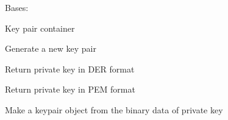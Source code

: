 \documentclass[letterpaper,10pt,english]{sphinxmanual}
\begin{document}

\begin{fulllineitems}
\label{\detokenize{bbc1.core.bbclib:bbc1.core.bbclib.KeyPair}}
Bases: 

Key pair container

\begin{fulllineitems}
\label{\detokenize{bbc1.core.bbclib:bbc1.core.bbclib.KeyPair.generate}}
Generate a new key pair

\end{fulllineitems}


\begin{fulllineitems}
\label{\detokenize{bbc1.core.bbclib:bbc1.core.bbclib.KeyPair.get_private_key_in_der}}
Return private key in DER format

\end{fulllineitems}


\begin{fulllineitems}
\label{\detokenize{bbc1.core.bbclib:bbc1.core.bbclib.KeyPair.get_private_key_in_pem}}
Return private key in PEM format

\end{fulllineitems}


\begin{fulllineitems}
\label{\detokenize{bbc1.core.bbclib:bbc1.core.bbclib.KeyPair.mk_keyobj_from_private_key}}
Make a keypair object from the binary data of private key

\end{fulllineitems}


\end{fulllineitems}
\end{document}
